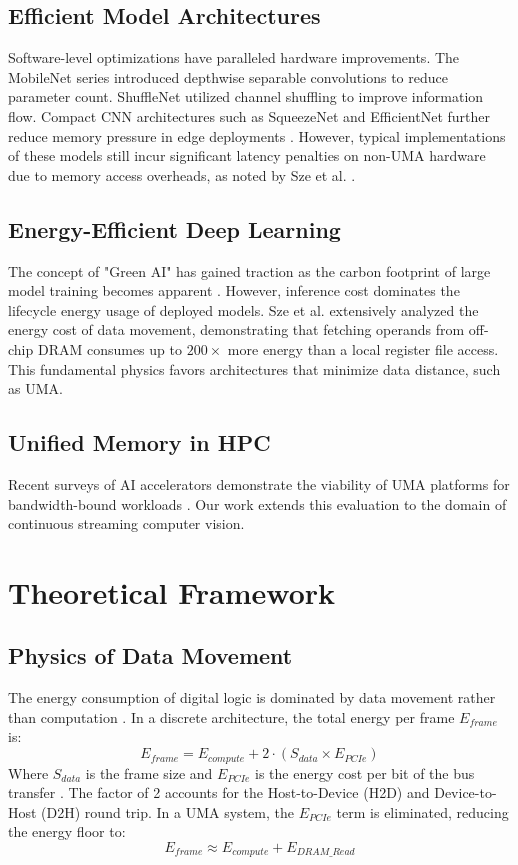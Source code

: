 \documentclass[conference]{IEEEtran}
\begin{document}
\subsection{Efficient Model Architectures}
Software-level optimizations have paralleled hardware improvements. The MobileNet series \cite{b31, b32} introduced depthwise separable convolutions to reduce parameter count. ShuffleNet \cite{b33, b34} utilized channel shuffling to improve information flow. Compact CNN architectures such as SqueezeNet and EfficientNet further reduce memory pressure in edge deployments \cite{b35, b36}. However, typical implementations of these models still incur significant latency penalties on non-UMA hardware due to memory access overheads, as noted by Sze et al. \cite{b28}.

\subsection{Energy-Efficient Deep Learning}
The concept of "Green AI" has gained traction as the carbon footprint of large model training becomes apparent \cite{b12}. However, inference cost dominates the lifecycle energy usage of deployed models. Sze et al. \cite{b1} extensively analyzed the energy cost of data movement, demonstrating that fetching operands from off-chip DRAM consumes up to $200\times$ more energy than a local register file access. This fundamental physics favors architectures that minimize data distance, such as UMA.

\subsection{Unified Memory in HPC}
Recent surveys of AI accelerators demonstrate the viability of UMA platforms for bandwidth-bound workloads \cite{b6}. Our work extends this evaluation to the domain of continuous streaming computer vision.

\section{Theoretical Framework}

\subsection{Physics of Data Movement}
The energy consumption of digital logic is dominated by data movement rather than computation \cite{b8}. In a discrete architecture, the total energy per frame $E_{frame}$ is:
\begin{equation}
E_{frame} = E_{compute} + 2 \cdot (S_{data} \times E_{PCIe})
\end{equation}
Where $S_{data}$ is the frame size and $E_{PCIe}$ is the energy cost per bit of the bus transfer \cite{b8, b1}. The factor of 2 accounts for the Host-to-Device (H2D) and Device-to-Host (D2H) round trip. In a UMA system, the $E_{PCIe}$ term is eliminated, reducing the energy floor to:
\begin{equation}
E_{frame} \approx E_{compute} + E_{DRAM\_Read}
\end{equation}
\end{document}
